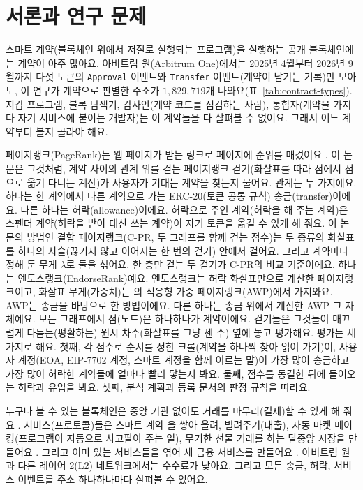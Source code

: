 \chapter{서론과 연구 문제}
\label{ch:introduction}

스마트 계약(블록체인 위에서 저절로 실행되는 프로그램)을 실행하는 공개 블록체인에는 계약이 아주 많아요. 아비트럼 원(Arbitrum One)에서는 2025년 4월부터 2026년 9월까지 다섯 토큰의 \texttt{Approval} 이벤트와 \texttt{Transfer} 이벤트(계약이 남기는 기록)만 보아도, 이 연구가 계약으로 판별한 주소가 $1{,}829{,}719$개 나와요(표~\ref{tab:contract-types}). 지갑 프로그램, 블록 탐색기, 감사인(계약 코드를 점검하는 사람), 통합자(계약을 가져다 자기 서비스에 붙이는 개발자)는 이 계약들을 다 살펴볼 수 없어요. 그래서 어느 계약부터 볼지 골라야 해요.

페이지랭크(PageRank)는 웹 페이지가 받는 링크로 페이지에 순위를 매겼어요 \parencite{page1999pagerank}. 이 논문은 그것처럼, 계약 사이의 관계 위를 걷는 페이지랭크 걷기(화살표를 따라 점에서 점으로 옮겨 다니는 계산)가 사용자가 기대는 계약을 찾는지 물어요. 관계는 두 가지예요. 하나는 한 계약에서 다른 계약으로 가는 ERC-20(토큰 공통 규칙) 송금(transfer)이에요. 다른 하나는 허락(allowance)이에요. 허락으로 주인 계약(허락을 해 주는 계약)은 스펜더 계약(허락을 받아 대신 쓰는 계약)이 자기 토큰을 옮길 수 있게 해 줘요. 이 논문의 방법인 결합 페이지랭크(\mbox{C-PR}, 두 그래프를 함께 걷는 점수)는 두 종류의 화살표를 하나의 사슬(끊기지 않고 이어지는 한 번의 걷기) 안에서 걸어요. 그리고 계약마다 정해 둔 무게 $\lambda$로 둘을 섞어요. 한 층만 걷는 두 걷기가 \mbox{C-PR}의 비교 기준이에요. 하나는 엔도스랭크(EndorseRank)예요. 엔도스랭크는 허락 화살표만으로 계산한 페이지랭크이고, 화살표 무게(가중치)는 \textcite{do2023awp}의 적응형 가중 페이지랭크(AWP)에서 가져와요. AWP는 송금을 바탕으로 한 방법이에요. 다른 하나는 송금 위에서 계산한 AWP 그 자체예요. 모든 그래프에서 점(노드)은 하나하나가 계약이에요. 걷기들은 그것들이 매끄럽게 다듬는(평활하는) 원시 차수(화살표를 그냥 센 수) 옆에 놓고 평가해요. 평가는 세 가지로 해요. 첫째, 각 점수로 순서를 정한 크롤(계약을 하나씩 찾아 읽어 가기)이, 사용자 계정(EOA, EIP-7702 계정, 스마트 계정을 함께 이르는 말)이 가장 많이 송금하고 가장 많이 허락한 계약들에 얼마나 빨리 닿는지 봐요. 둘째, 점수를 동결한 뒤에 들어오는 허락과 유입을 봐요. 셋째, 분석 계획과 등록 문서의 판정 규칙을 따라요.


누구나 볼 수 있는 블록체인은 중앙 기관 없이도 거래를 마무리(결제)할 수 있게 해 줘요 \parencite{nakamoto2008bitcoin}. 서비스(프로토콜)들은 스마트 계약 \parencite{szabo1997formalizing}을 쌓아 올려, 빌려주기(대출), 자동 마켓 메이킹(프로그램이 자동으로 사고팔아 주는 일), 무기한 선물 거래를 하는 탈중앙 시장을 만들어요 \parencite{werner2022sok}. 그리고 이미 있는 서비스들을 엮어 새 금융 서비스를 만들어요 \parencite{kitzler2023defi}. 아비트럼 원과 다른 레이어 2(L2) 네트워크에서는 수수료가 낮아요. 그리고 모든 송금, 허락, 서비스 이벤트를 주소 하나하나마다 살펴볼 수 있어요.

